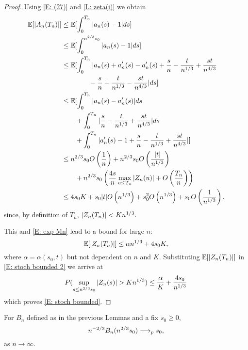 \begin{proof}
    Using \ref{E: (27)} and \ref{L: zeta(i)} we obtain
    \begin{align*}
    \mathbb{E}[|A_n(T_n)|] &\leq \mathbb{E}[\int_{0}^{T_n} |a_n(s)-1|ds] \\
    &\leq \mathbb{E}[\int_{0}^{n^{2 / 3}s_0} |a_n(s)-1|ds] \\
    &\leq \mathbb{E}[
    	\int_{0}^{T_n} | a_n(s) + a'_n(s) - a'_n(s) + \frac{s}{n} - \frac{t}{n^{1 / 3}} + \frac{st}{n^{4 / 3}
    	} \\
    &\qquad \qquad - \frac{s}{n} + \frac{t}{n^{1 / 3}} - \frac{st}{n^{4 / 3}} | ds] \\
    &\leq \mathbb{E}[
    	\int_{0}^{T_n} |a_n(s) - a'_n(s)|ds \\
    	&\qquad + \int_{0}^{T_n} |\frac{s}{n} - \frac{t}{n^{1 / 3}} + \frac{st}{n^{4 / 3}}| ds \\
    	&\qquad + \int_{0}^{T_n} |a'_n(s) - 1 + \frac{s}{n} - \frac{t}{n^{1 / 3}} + \frac{st}{n^{4 / 3}}|
    ] \\
    &\leq n^{2 / 3}s_0 O\left(\frac{1}{n}\right) + n^{2 / 3}s_0 O\left(\frac{|t|}{n^{1 / 3}}\right) \\
    &\qquad +  n^{2 / 3}s_0 \left( \frac{4s}{n} \max_{u \leq T_n}|Z_n(u)| + O\left(\frac{T_n}{n}\right)\right) \\
    &\leq 4 s_0 K + s_0|t|O\left(n^{1 / 3}\right) + s_0^2O\left(n^{1 / 3}\right) + s_0O\left(\frac{1}{n^{1 / 3}}\right),
    \end{align*}
    since, by definition of $T_n$, $|Z_n(T_n)| < Kn^{1 / 3}.$
    
    This and \ref{E: exp Mn} lead to a bound for large $n$:
    \begin{equation} \label{E: bound Zn}
    \mathbb{E}[|Z_n(T_n)|] \leq \alpha n^{1 / 3} + 4s_0K,
    \end{equation}
    where $\alpha = \alpha(s_0,t)$ but not dependent on $n$ and $K$. 
    Substituting $\mathbb{E}[|Z_n(T_n)|]$ in \ref{E: stoch bounded 2} we arrive at
    \begin{equation}
    P( \sup_{s\leq n^{2/3} s_0} |Z_n(s)| > K n^{1 / 3} ) \leq \frac{\alpha}{K} + \frac{4s_0}{n^{1 / 3}}
    \end{equation}
    which proves \ref{E: stoch bounded}.
\end{proof}


\begin{lemma} \label{L: limit Bn}
	For $B_n$ defined as in the previous Lemmas and a fix $s_0 \geq 0$,
	\begin{equation} \label{E: limit Bn}
	n^{-2 / 3} B_n(n^{2 / 3}s_0) \longrightarrow_p s_0,
	\end{equation}
	as $n \longrightarrow \infty$.
\end{lemma}


